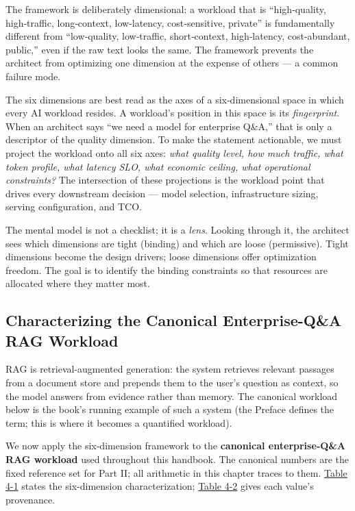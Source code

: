 The framework is deliberately dimensional: a workload that is
``high‑quality, high‑traffic, long‑context, low‑latency, cost‑sensitive,
private'' is fundamentally different from ``low‑quality, low‑traffic,
short‑context, high‑latency, cost‑abundant, public,'' even if the raw
text looks the same. The framework prevents the architect from
optimizing one dimension at the expense of others --- a common failure
mode.

\label{mental-model}


The six dimensions are best read as the axes of a six‑dimensional space
in which every AI workload resides. A workload's position in this space
is its \emph{fingerprint}. When an architect says ``we need a model for
enterprise Q\&A,'' that is only a descriptor of the quality dimension.
To make the statement actionable, we must project the workload onto all
six axes: \emph{what quality level, how much traffic, what token
profile, what latency SLO, what economic ceiling, what operational
constraints?} The intersection of these projections is the workload
point that drives every downstream decision --- model selection,
infrastructure sizing, serving configuration, and TCO.

The mental model is not a checklist; it is a \emph{lens}. Looking
through it, the architect sees which dimensions are tight (binding) and
which are loose (permissive). Tight dimensions become the design
drivers; loose dimensions offer optimization freedom. The goal is to
identify the binding constraints so that resources are allocated where
they matter most.

\label{worked-example}


\subsection{Characterizing the Canonical Enterprise-Q\&A RAG
Workload}\label{characterizing-the-canonical-enterprise-qa-rag-workload}

RAG is retrieval-augmented generation: the system retrieves relevant
passages from a document store and prepends them to the user's question
as context, so the model answers from evidence rather than memory. The
canonical workload below is the book's running example of such a system
(the Preface defines the term; this is where it becomes a quantified
workload).

We now apply the six‑dimension framework to the \textbf{canonical
enterprise‑Q\&A RAG workload} used throughout this handbook. The
canonical numbers are the fixed reference set for Part II; all
arithmetic in this chapter traces to them. \hyperref[tab:4.1]{Table 4-1} states the
six-dimension characterization; \hyperref[tab:4.2]{Table 4-2} gives each value's provenance.

